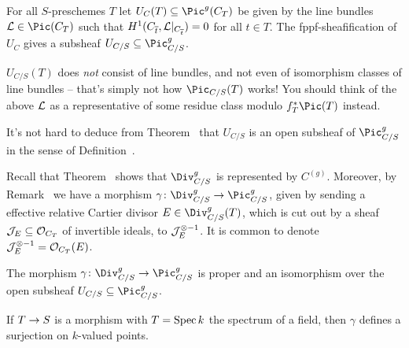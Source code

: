 \documentclass[a4paper,parskip=half,numbers=enddot, DIV=12]{scrreprt}
\begin{document}
\begin{defi}
	For all $S$-preschemes $T$ let $U_C(T)\subseteq \Pic^g(C_T)$ be given by the line bundles $\Ll\in\Pic(C_T)$ such that $H^1(C_{\overline{t}},\mathcal{L}|_{C_{\overline{t}}})=0$ for all $t\in T$. The fppf-sheafification of $U_C$ gives a subsheaf $U_{C/S}\subseteq \Pic_{C/S}^g$.
\end{defi}
\begin{rem}
	\begin{alphanumerate}
		\item $U_{C/S}(T)$ does \emph{not} consist of line bundles, and not even of isomorphism classes of line bundles -- that's simply not how $\Pic_{C/S}(T)$ works! You should think of the above $\mathcal{L}$ as a representative of some residue class modulo $f_T^*\Pic(T)$ instead.
		\item It's not hard to deduce from Theorem~ that $U_{C/S}$ is an open subsheaf of $\Pic_{C/S}^g$ in the sense of Definition~.
	\end{alphanumerate}
\end{rem}
Recall that Theorem~ shows that $\Div_{C/S}^g$ is represented by $C^{(g)}$. Moreover, by Remark~ we have a morphism $\gamma\colon\Div_{C/S}^g\morphism\Pic_{C/S}^g$, given by sending a  effective relative Cartier divisor $E\in\Div_{C/S}^g(T)$, which is cut out by a sheaf $\mathcal{J}_E\subseteq \mathcal{O}_{C_T}$ of invertible ideals, to $\mathcal{J}_E^{\otimes -1}$. It is common to denote $\mathcal{J}_E^{\otimes -1}=\mathcal{O}_{C_T}(E)$.
\begin{prop}
	\begin{alphanumerate}
		\item {}The morphism $\gamma\colon\Div_{C/S}^g\morphism\Pic_{C/S}^g$ is proper and an isomorphism over the open subsheaf $U_{C/S}\subseteq \Pic_{C/S}^g$.
		\item If $T\morphism S$ is a morphism with $T=\operatorname{Spec} k$ the spectrum of a field, then $\gamma$ defines a surjection on $k$-valued points.
	\end{alphanumerate}
 \end{prop}
\end{document}
